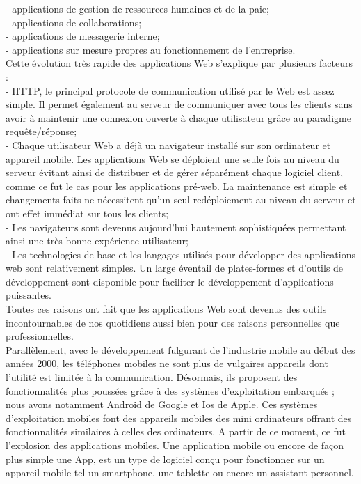 - applications de gestion de ressources humaines et de la paie;\\
- applications de collaborations;\\
- applications de messagerie interne;\\
- applications sur mesure propres au fonctionnement de l’entreprise.\\
Cette évolution très rapide des applications Web s'explique par plusieurs facteurs : \\
- HTTP, le principal protocole de communication utilisé par le Web est assez simple. Il permet également au serveur de communiquer avec tous les clients sans avoir à maintenir une connexion ouverte à chaque utilisateur grâce au paradigme requête/réponse;\\
- Chaque utilisateur Web a déjà un navigateur installé sur son ordinateur et appareil mobile. Les applications Web se déploient une seule fois au niveau du serveur évitant ainsi de distribuer et de gérer séparément chaque logiciel client, comme ce fut le cas pour les applications pré-web. La maintenance est simple et changements faits ne nécessitent qu'un seul redéploiement au niveau du serveur et ont effet immédiat sur tous les clients;\\
- Les navigateurs sont devenus aujourd'hui hautement sophistiquées permettant ainsi une très bonne expérience utilisateur;\\
- Les technologies de base et les langages utilisés pour développer des applications web sont relativement simples. Un large éventail de plates-formes et d'outils de développement sont disponible pour faciliter le développement d'applications puissantes.\\
Toutes ces raisons ont fait que les applications Web sont devenus des outils incontournables de nos quotidiens aussi bien pour des raisons personnelles que professionnelles.\\
Parallèlement, avec le développement fulgurant de l'industrie mobile au début des années 2000, les téléphones mobiles ne sont plus de vulgaires appareils dont l'utilité est limitée à la communication. Désormais, ils proposent des fonctionnalités plus poussées grâce à des systèmes d'exploitation embarqués ; nous avons notamment Android de Google et Ios de Apple. Ces systèmes d'exploitation mobiles font des appareils mobiles des mini ordinateurs offrant des fonctionnalités similaires à celles des ordinateurs. A partir de ce moment, ce fut l'explosion des applications mobiles. Une application mobile ou encore de façon plus simple une App, est un type de logiciel conçu pour fonctionner sur un appareil mobile tel un smartphone, une tablette ou encore un assistant personnel. \\
